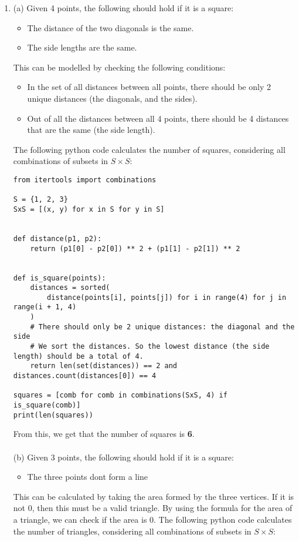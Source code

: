\documentclass[a4paper]{article}
\begin{document}
\begin{enumerate}
\item (a) Given 4 points, the following should hold if it is a square:
\begin{itemize}
    \item The distance of the two diagonals is the same.
    \item The side lengths are the same.
\end{itemize}

This can be modelled by checking the following conditions:
\begin{itemize}
    \item In the set of all distances between all points, there should be only 2 unique distances (the diagonals, and the sides).
    \item Out of all the distances between all 4 points, there should be 4 distances that are the same (the side length).
\end{itemize}
The following python code calculates the number of squares, considering all combinations of subsets in $S\times S$:
\begin{verbatim}
from itertools import combinations

S = {1, 2, 3}
SxS = [(x, y) for x in S for y in S]


def distance(p1, p2):
    return (p1[0] - p2[0]) ** 2 + (p1[1] - p2[1]) ** 2


def is_square(points):
    distances = sorted(
        distance(points[i], points[j]) for i in range(4) for j in range(i + 1, 4)
    )
    # There should only be 2 unique distances: the diagonal and the side
    # We sort the distances. So the lowest distance (the side length) should be a total of 4.
    return len(set(distances)) == 2 and distances.count(distances[0]) == 4

squares = [comb for comb in combinations(SxS, 4) if is_square(comb)]
print(len(squares))
\end{verbatim}

From this, we get that the number of squares is \textbf{6}.\\
\\
(b) Given 3 points, the following should hold if it is a square:
\begin{itemize}
    \item The three points dont form a line
\end{itemize}

This can be calculated by taking the area formed by the three vertices. If it is not 0, then this must be a valid triangle. By using the formula for the area of a triangle, we can check if the area is 0. The following python code calculates the number of triangles, considering all combinations of subsets in $S\times S$:


\end{enumerate}
\end{document}
